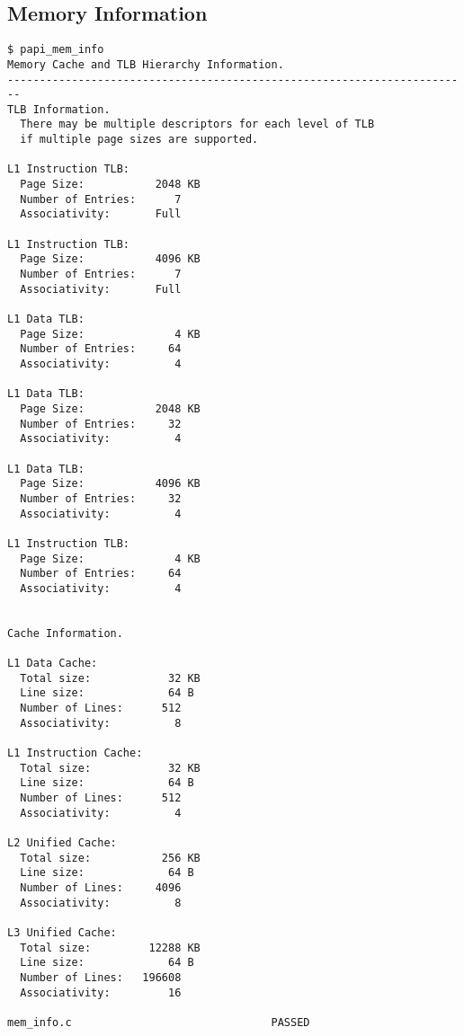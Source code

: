 \documentclass{article}
\begin{document}
\subsection{Memory Information}
\begin{lstlisting}
$ papi_mem_info
Memory Cache and TLB Hierarchy Information.
------------------------------------------------------------------------
TLB Information.
  There may be multiple descriptors for each level of TLB
  if multiple page sizes are supported.

L1 Instruction TLB:
  Page Size:           2048 KB
  Number of Entries:      7
  Associativity:       Full

L1 Instruction TLB:
  Page Size:           4096 KB
  Number of Entries:      7
  Associativity:       Full

L1 Data TLB:
  Page Size:              4 KB
  Number of Entries:     64
  Associativity:          4

L1 Data TLB:
  Page Size:           2048 KB
  Number of Entries:     32
  Associativity:          4

L1 Data TLB:
  Page Size:           4096 KB
  Number of Entries:     32
  Associativity:          4

L1 Instruction TLB:
  Page Size:              4 KB
  Number of Entries:     64
  Associativity:          4


Cache Information.

L1 Data Cache:
  Total size:            32 KB
  Line size:             64 B
  Number of Lines:      512
  Associativity:          8

L1 Instruction Cache:
  Total size:            32 KB
  Line size:             64 B
  Number of Lines:      512
  Associativity:          4

L2 Unified Cache:
  Total size:           256 KB
  Line size:             64 B
  Number of Lines:     4096
  Associativity:          8

L3 Unified Cache:
  Total size:         12288 KB
  Line size:             64 B
  Number of Lines:   196608
  Associativity:         16

mem_info.c                               PASSED
\end{lstlisting}
\end{document}
